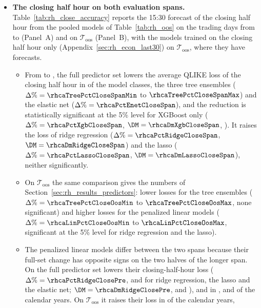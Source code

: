 \begin{itemize}
\item \textbf{The closing half hour on both evaluation spans.} Table~\ref{tab:rh_close_accuracy} reports the 15:30
  forecast of the closing half hour from the pooled models of Table~\ref{tab:rh_oos} on the \rhcaNdaysSpan{} trading days
  from \rhcaStartSpan{} to \rhcaEndSpan{} (Panel~A) and on $\mathcal T_{\mathrm{oos}}$ (Panel~B), with the models trained
  on the closing half hour only (Appendix~\ref{sec:rh_econ_last30}) on $\mathcal T_{\mathrm{oos}}$, where they have
  forecasts.
  \begin{itemize}
  \item From \rhcaStartSpan{} to \rhcaEndSpan, the full predictor set lowers the average QLIKE loss of the closing half
    hour in \rhcaNLowerCloseSpan{} of the \rhorAfPairs{} model classes, the three tree ensembles
    ($\Delta\% = \rhcaTreePctCloseSpanMin$ to $\rhcaTreePctCloseSpanMax$) and the elastic net
    ($\Delta\% = \rhcaPctEnetCloseSpan$), and the reduction is statistically significant at the 5\% level for XGBoost
    only ($\Delta\% = \rhcaPctXgbCloseSpan$, $\DM = \rhcaDmXgbCloseSpan$, \rhcaPXgbCloseSpan). It raises the loss of
    ridge regression ($\Delta\% = \rhcaPctRidgeCloseSpan$, $\DM = \rhcaDmRidgeCloseSpan$) and the lasso
    ($\Delta\% = \rhcaPctLassoCloseSpan$, $\DM = \rhcaDmLassoCloseSpan$), neither significantly.
  \item On $\mathcal T_{\mathrm{oos}}$ the same comparison gives the numbers of
    Section~\ref{sec:rh_results_predictors}: lower losses for the tree ensembles ($\Delta\% = \rhcaTreePctCloseOosMin$ to
    $\rhcaTreePctCloseOosMax$, none significant) and higher losses for the penalized linear models
    ($\Delta\% = \rhcaLinPctCloseOosMin$ to $\rhcaLinPctCloseOosMax$, significant at the 5\% level for ridge regression
    and the lasso).
  \item The penalized linear models differ between the two spans because their full-set change has opposite signs on
    the two halves of the longer span. On \rhcaYearsPre{} the full predictor set lowers their closing-half-hour loss ($\Delta\% = \rhcaPctRidgeClosePre$,
    \rhcaPctLassoClosePre{} and \rhcaPctEnetClosePre{} for ridge regression, the lasso and the elastic net;
    $\DM = \rhcaDmRidgeClosePre$, \rhcaDmLassoClosePre{} and \rhcaDmEnetClosePre), and in \rhcaYrsDownRidgeClosePre,
    \rhcaYrsDownLassoClosePre{} and \rhcaYrsDownEnetClosePre{} of the \rhcaNYrsPre{} calendar years. On
    $\mathcal T_{\mathrm{oos}}$ it raises their loss in \rhcaYrsUpRidgeCloseOos{} of the \rhcaNYrsOos{} calendar years,

\end{itemize}
\end{itemize}
